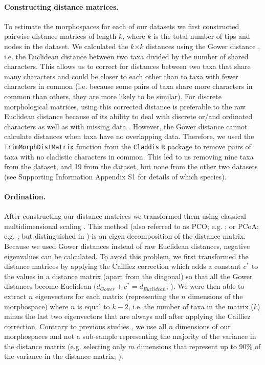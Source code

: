 \documentclass[12pt,a4paper]{article}
\begin{document}
\paragraph{Constructing distance matrices.}
To estimate the morphospaces for each of our datasets we first constructed pairwise distance matrices of length $k$, where $k$ is the total number of tips and nodes in the dataset.
We calculated the $k$$\times$$k$ distances using the Gower distance \citep{Gower71}, i.e. the Euclidean distance between two taxa divided by the number of shared characters. 
This allows us to correct for distances between two taxa that share many characters and could be closer to each other than to taxa with fewer characters in common (i.e. because some pairs of taxa share more characters in common than others, they are more likely to be similar).
For discrete morphological matrices, using this corrected distance is preferable to the raw Euclidean distance because of its ability to deal with discrete or/and ordinated characters as well as with missing data \citep{anderson2012using}.
However, the Gower distance cannot calculate distances when taxa have no overlapping data.
Therefore, we used the \texttt{TrimMorphDistMatrix} function from the \texttt{Claddis} \texttt{R} package to remove pairs of taxa with no cladistic characters in common.
This led to us removing nine taxa from the \cite{bapst2016topology} dataset, and 19 from the \cite{brusatte2014gradual} dataset, but none from the other two datasets (see Supporting Information Appendix S1 for details of which species). 

\paragraph{Ordination.}
After constructing our distance matrices we transformed them using classical multidimensional scaling \citep[MDS;][]{torgerson1965multidimensional,GOWER01121966,cailliez1983analytical}.
This method (also referred to as PCO; e.g. \citealt{Brusatte2015}; or PCoA; e.g. \citealt{paradisape:2004}; but distinguished in \citealt{legendre2012numerical}) is an eigen decomposition of the distance matrix.
Because we used Gower distances instead of raw Euclidean distances, negative eigenvalues can be calculated.
To avoid this problem, we first transformed the distance matrices by applying the Cailliez correction \citep{cailliez1983analytical} which adds a constant $c^*$ to the values in a distance matrix (apart from the diagonal) so that all the Gower distances become Euclidean ($d_{Gower}+c^*=d_{Euclidean}$; \citealt{cailliez1983analytical}). 
We were then able to extract $n$ eigenvectors for each matrix (representing the $n$ dimensions of the morphospace) where $n$ is equal to $k-2$, i.e. the number of taxa in the matrix ($k$) minus the last two eigenvectors that are always null after applying the Cailliez correction.
Contrary to previous studies \citep[e.g][]{brusatte50,cisneros2010,prentice2011,anderson2012using,Hughes20082013,bentonmodels2014}, we use all $n$ dimensions of our morphospaces and not a sub-sample representing the majority of the variance in the distance matrix (e.g. selecting only $m$ dimensions that represent up to 90\% of the variance in the distance matrix; \citealt{Brusatte12092008,toljagictriassic-jurassic2013}).
\end{document}
